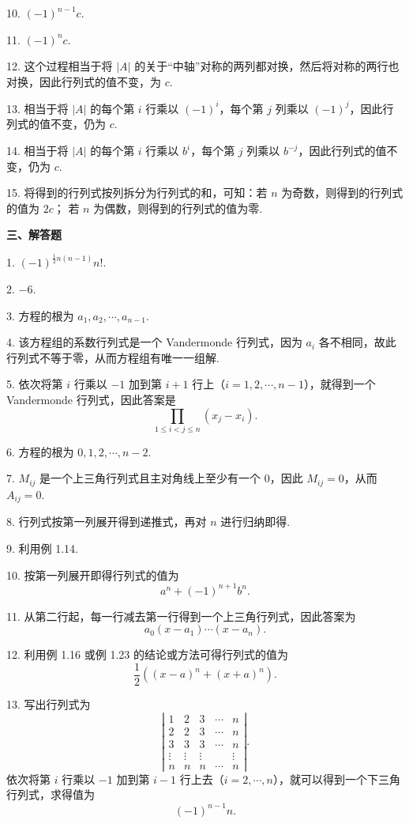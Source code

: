 \documentclass[UTF8,12pt,a4paper,fontset=fandol]{ctexart}
\begin{document}
10. $(-1)^{n-1}c$.

11. $(-1)^nc$.

12. 这个过程相当于将 $|A|$ 的关于“中轴”对称的两列都对换，然后将对称的两行也对换，因此行列式的值不变，为 $c$.

13. 相当于将 $|A|$ 的每个第 $i$ 行乘以 $(-1)^i$，每个第 $j$ 列乘以 $(-1)^j$，因此行列式的值不变，仍为 $c$.

14. 相当于将 $|A|$ 的每个第 $i$ 行乘以 $b^i$，每个第 $j$ 列乘以 $b^{-j}$，因此行列式的值不变，仍为 $c$.

15. 将得到的行列式按列拆分为行列式的和，可知：若 $n$ 为奇数，则得到的行列式的值为 $2c$；
若 $n$ 为偶数，则得到的行列式的值为零.

\noindent\textbf{三、解答题}

1. $(-1)^{\frac12n(n-1)}n!$.

2. $-6$.

3. 方程的根为 $a_1,a_2,\cdots,a_{n-1}$.

4. 该方程组的系数行列式是一个 Vandermonde 行列式，因为 $a_i$ 各不相同，故此行列式不等于零，从而方程组有唯一一组解.

5. 依次将第 $i$ 行乘以 $-1$ 加到第 $i+1$ 行上（$i=1,2,\cdots,n-1$），就得到一个 Vandermonde 行列式，因此答案是
\[
\prod_{1\le i<j\le n}(x_j-x_i).
\]

6. 方程的根为 $0,1,2,\cdots,n-2$.

7. $M_{ij}$ 是一个上三角行列式且主对角线上至少有一个 $0$，因此 $M_{ij}=0$，从而 $A_{ij}=0$.

8. 行列式按第一列展开得到递推式，再对 $n$ 进行归纳即得.

9. 利用例 1.14.

10. 按第一列展开即得行列式的值为
\[
a^n+(-1)^{n+1}b^n.
\]

11. 从第二行起，每一行减去第一行得到一个上三角行列式，因此答案为
\[
a_0(x-a_1)\cdots(x-a_n).
\]

12. 利用例 1.16 或例 1.23 的结论或方法可得行列式的值为
\[
\frac12\left((x-a)^n+(x+a)^n\right).
\]

13. 写出行列式为
\[
\left|\begin{array}{ccccc}
1&2&3&\cdots&n\\
2&2&3&\cdots&n\\
3&3&3&\cdots&n\\
\vdots&\vdots&\vdots&&\vdots\\
n&n&n&\cdots&n
\end{array}\right|.
\]
依次将第 $i$ 行乘以 $-1$ 加到第 $i-1$ 行上去（$i=2,\cdots,n$），就可以得到一个下三角行列式，求得值为
\[
(-1)^{n-1}n.
\]
\end{document}
